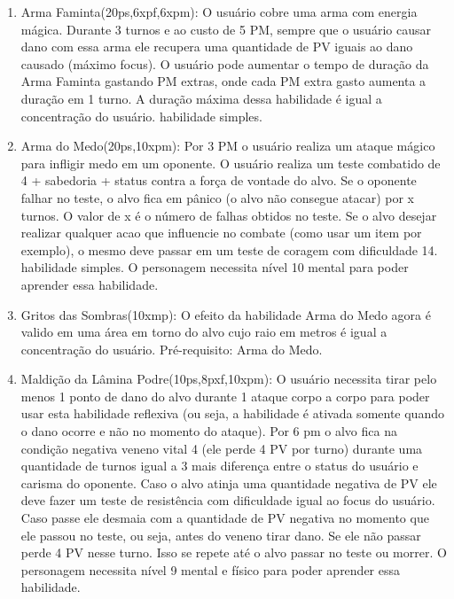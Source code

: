 \begin{enumerate}
    
  
  	\item Arma Faminta(20ps,6xpf,6xpm): O usuário cobre uma arma com energia mágica. Durante 3 turnos e ao custo de 5 PM, sempre que o usuário causar dano com essa arma ele recupera uma quantidade de PV iguais ao dano causado (máximo focus). O usuário pode aumentar o tempo de duração da Arma Faminta gastando PM extras, onde cada PM extra gasto aumenta a duração em 1 turno. A duração máxima dessa habilidade é igual a concentração do usuário. habilidade simples.
  	
  	\item Arma do Medo(20ps,10xpm): Por 3 PM o usuário realiza um ataque mágico para infligir medo em um oponente. O usuário realiza um teste combatido de 4 + sabedoria + status contra a força de vontade do alvo. Se o oponente falhar no teste, o alvo fica em pânico (o alvo não consegue atacar) por x turnos. O valor de x é o número de falhas obtidos no teste. Se o alvo desejar realizar qualquer acao que influencie no combate (como usar um item por exemplo), o mesmo deve passar em um teste de coragem com dificuldade 14. habilidade simples. O personagem necessita nível 10 mental para poder aprender essa habilidade.
  	
  	\item Gritos das Sombras(10xmp): O efeito da habilidade Arma do Medo agora é valido em uma área em torno do alvo cujo raio em metros é igual a concentração do usuário. Pré-requisito: Arma do Medo.
  
  	\item Maldição da Lâmina Podre(10ps,8pxf,10xpm): O usuário necessita tirar pelo menos 1 ponto de dano do alvo durante 1 ataque corpo a corpo para poder usar esta habilidade reflexiva (ou seja, a habilidade é ativada somente quando o dano ocorre e não no momento do ataque). Por 6 pm o alvo fica na condição negativa veneno vital 4 (ele perde 4 PV por turno) durante uma quantidade de turnos igual a 3 mais diferença entre o status do usuário e carisma do oponente. Caso o alvo atinja uma quantidade negativa de PV ele deve fazer um teste de resistência com dificuldade igual ao focus do usuário. Caso passe ele desmaia com a quantidade de PV negativa no momento que ele passou no teste, ou seja, antes do veneno tirar dano. Se ele não passar perde 4 PV nesse turno. Isso se repete até o alvo passar no teste ou morrer. O personagem necessita nível 9 mental e físico para poder aprender essa habilidade.
    

\end{enumerate}
